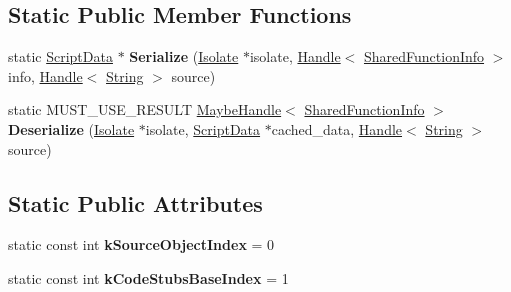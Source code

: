\subsection*{Static Public Member Functions}
\begin{DoxyCompactItemize}
\item 
static \hyperlink{classv8_1_1internal_1_1_script_data}{Script\+Data} $\ast$ {\bfseries Serialize} (\hyperlink{classv8_1_1internal_1_1_isolate}{Isolate} $\ast$isolate, \hyperlink{classv8_1_1internal_1_1_handle}{Handle}$<$ \hyperlink{classv8_1_1internal_1_1_shared_function_info}{Shared\+Function\+Info} $>$ info, \hyperlink{classv8_1_1internal_1_1_handle}{Handle}$<$ \hyperlink{classv8_1_1internal_1_1_string}{String} $>$ source)\hypertarget{classv8_1_1internal_1_1_code_serializer_a50ee2c69501e7cbac4400369ac2d88d6}{}\label{classv8_1_1internal_1_1_code_serializer_a50ee2c69501e7cbac4400369ac2d88d6}

\item 
static M\+U\+S\+T\+\_\+\+U\+S\+E\+\_\+\+R\+E\+S\+U\+LT \hyperlink{classv8_1_1internal_1_1_maybe_handle}{Maybe\+Handle}$<$ \hyperlink{classv8_1_1internal_1_1_shared_function_info}{Shared\+Function\+Info} $>$ {\bfseries Deserialize} (\hyperlink{classv8_1_1internal_1_1_isolate}{Isolate} $\ast$isolate, \hyperlink{classv8_1_1internal_1_1_script_data}{Script\+Data} $\ast$cached\+\_\+data, \hyperlink{classv8_1_1internal_1_1_handle}{Handle}$<$ \hyperlink{classv8_1_1internal_1_1_string}{String} $>$ source)\hypertarget{classv8_1_1internal_1_1_code_serializer_af4887a12dc89adac95d0ddbcf1e369fc}{}\label{classv8_1_1internal_1_1_code_serializer_af4887a12dc89adac95d0ddbcf1e369fc}

\end{DoxyCompactItemize}
\subsection*{Static Public Attributes}
\begin{DoxyCompactItemize}
\item 
static const int {\bfseries k\+Source\+Object\+Index} = 0\hypertarget{classv8_1_1internal_1_1_code_serializer_af522f36416ca441547ad26be622b850a}{}\label{classv8_1_1internal_1_1_code_serializer_af522f36416ca441547ad26be622b850a}

\item 
static const int {\bfseries k\+Code\+Stubs\+Base\+Index} = 1\hypertarget{classv8_1_1internal_1_1_code_serializer_a273d27fafbb3b5c7f80de678ced76681}{}\label{classv8_1_1internal_1_1_code_serializer_a273d27fafbb3b5c7f80de678ced76681}

\end{DoxyCompactItemize}
